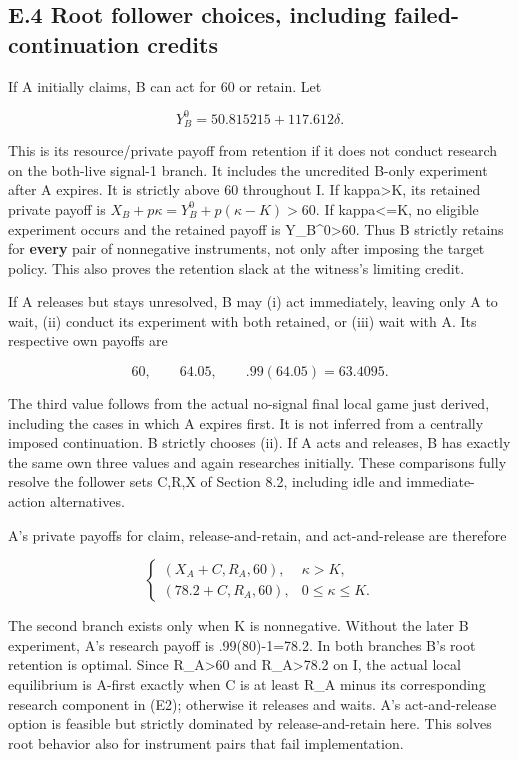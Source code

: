 \documentclass[
  11pt,
]{article}
\begin{document}
\subsection{E.4 Root follower choices, including failed-continuation
credits}\label{e.4-root-follower-choices-including-failed-continuation-credits}

If A initially claims, B can act for 60 or retain. Let

\[Y_B^0=50.815215+117.612\delta.\]

This is its resource/private payoff from retention if it does not
conduct research on the both-live signal-1 branch. It includes the
uncredited B-only experiment after A expires. It is strictly above 60
throughout I. If kappa\textgreater K, its retained private payoff is
\(X_B+p\kappa=Y_B^0+p(\kappa-K)>60\). If kappa\textless=K, no eligible
experiment occurs and the retained payoff is Y\_B\^{}0\textgreater60.
Thus B strictly retains for \textbf{every} pair of nonnegative
instruments, not only after imposing the target policy. This also proves
the retention slack at the witness's limiting credit.

If A releases but stays unresolved, B may (i) act immediately, leaving
only A to wait, (ii) conduct its experiment with both retained, or (iii)
wait with A. Its respective own payoffs are

\[60,\qquad64.05,\qquad .99(64.05)=63.4095.\]

The third value follows from the actual no-signal final local game just
derived, including the cases in which A expires first. It is not
inferred from a centrally imposed continuation. B strictly chooses (ii).
If A acts and releases, B has exactly the same own three values and
again researches initially. These comparisons fully resolve the follower
sets C,R,X of Section 8.2, including idle and immediate-action
alternatives.

A's private payoffs for claim, release-and-retain, and act-and-release
are therefore

\[\begin{cases}(X_A+C,R_A,60),&\kappa>K,\\
(78.2+C,R_A,60),&0\leq\kappa\leq K.
\end{cases} \tag{E2}\]

The second branch exists only when K is nonnegative. Without the later B
experiment, A's research payoff is .99(80)-1=78.2. In both branches B's
root retention is optimal. Since R\_A\textgreater60 and
R\_A\textgreater78.2 on I, the actual local equilibrium is A-first
exactly when C is at least R\_A minus its corresponding research
component in (E2); otherwise it releases and waits. A's act-and-release
option is feasible but strictly dominated by release-and-retain here.
This solves root behavior also for instrument pairs that fail
implementation.
\end{document}
